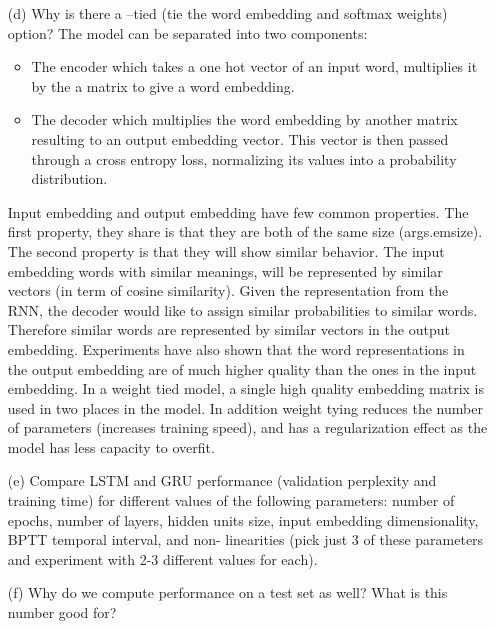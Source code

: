 \documentclass[11pt]{article}
\newcommand{\0}{\mat{0}}
\begin{document}
\begin{itemize}
     \item[(d)] 
    Why is there a --tied (tie the word embedding and softmax weights) option?
    The model can be separated into two components:
    \begin{itemize}
     \item The encoder which takes a one hot vector of an input word, multiplies it by the a matrix to give a word embedding. 
     \item The decoder which multiplies the word embedding by another matrix resulting to an output embedding vector. This vector is then passed through a cross entropy loss, normalizing its values into a probability distribution.
    \end{itemize}
    Input embedding and output embedding have few common properties. The first property, they share is that they are both of the same size (args.emsize). The second property is that they will show similar behavior.
    The input embedding words with similar meanings, will be represented by similar vectors (in term of cosine similarity). Given the representation from the RNN, the decoder would like to assign similar probabilities to similar words.
    Therefore similar words are represented by similar vectors in the output embedding. Experiments have also shown that the word representations in the output embedding are of much higher quality than the ones in the input
    embedding. In a weight tied model, a single high quality embedding matrix is used in two places in the model. In addition weight tying reduces the number of parameters (increases training speed), and has a regularization effect
    as the model has less capacity to overfit.       
     \item[(e)] 
     Compare LSTM and GRU performance (validation perplexity and training time) for different values of the following parameters: number of epochs, number of layers, hidden units size, input embedding dimensionality, BPTT temporal interval, and non- linearities (pick just 3 of these parameters and experiment with 2-3 different values for each).
     \item[(f)] Why do we compute performance on a test set as well? What is this number good for?
 \end{itemize}   
 
\end{document}
